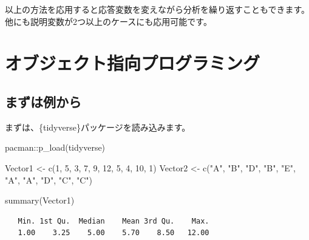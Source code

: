 \documentclass[
  a4paper,
  pandoc,
  ja=standard,
  jafont=haranoaji]{bxjsbook}
\newenvironment{Shaded}{\begin{snugshade}}{\end{snugshade}}
\newcommand{\DecValTok}[1]{\textcolor[rgb]{0.68,0.00,0.00}{#1}}
\newcommand{\FunctionTok}[1]{\textcolor[rgb]{0.28,0.35,0.67}{#1}}
\newcommand{\NormalTok}[1]{\textcolor[rgb]{0.00,0.48,0.65}{#1}}
\newcommand{\OtherTok}[1]{\textcolor[rgb]{0.00,0.48,0.65}{#1}}
\newcommand{\SpecialCharTok}[1]{\textcolor[rgb]{0.37,0.37,0.37}{#1}}
\newcommand{\StringTok}[1]{\textcolor[rgb]{0.13,0.47,0.30}{#1}}
\begin{document}
以上の方法を応用すると応答変数を変えながら分析を繰り返すこともできます。他にも説明変数が2つ以上のケースにも応用可能です。

\hypertarget{sec-oop}{%
\chapter{オブジェクト指向プログラミング}\label{sec-oop}}

\hypertarget{sec-oop_intro}{%
\section{まずは例から}\label{sec-oop_intro}}

まずは、\{tidyverse\}パッケージを読み込みます。

\begin{Shaded}
\begin{Highlighting}[numbers=left,,]
\NormalTok{pacman}\SpecialCharTok{::}\FunctionTok{p\_load}\NormalTok{(tidyverse)}
\end{Highlighting}
\end{Shaded}

\begin{Shaded}
\begin{Highlighting}[numbers=left,,]
\NormalTok{Vector1 }\OtherTok{\textless{}{-}} \FunctionTok{c}\NormalTok{(}\DecValTok{1}\NormalTok{, }\DecValTok{5}\NormalTok{, }\DecValTok{3}\NormalTok{, }\DecValTok{7}\NormalTok{, }\DecValTok{9}\NormalTok{, }\DecValTok{12}\NormalTok{, }\DecValTok{5}\NormalTok{, }\DecValTok{4}\NormalTok{, }\DecValTok{10}\NormalTok{, }\DecValTok{1}\NormalTok{)}
\NormalTok{Vector2 }\OtherTok{\textless{}{-}} \FunctionTok{c}\NormalTok{(}\StringTok{"A"}\NormalTok{, }\StringTok{"B"}\NormalTok{, }\StringTok{"D"}\NormalTok{, }\StringTok{"B"}\NormalTok{, }\StringTok{"E"}\NormalTok{, }\StringTok{"A"}\NormalTok{, }\StringTok{"A"}\NormalTok{, }\StringTok{"D"}\NormalTok{, }\StringTok{"C"}\NormalTok{, }\StringTok{"C"}\NormalTok{)}
\end{Highlighting}
\end{Shaded}

\begin{Shaded}
\begin{Highlighting}[numbers=left,,]
\FunctionTok{summary}\NormalTok{(Vector1)}
\end{Highlighting}
\end{Shaded}

\begin{verbatim}
   Min. 1st Qu.  Median    Mean 3rd Qu.    Max. 
   1.00    3.25    5.00    5.70    8.50   12.00 
\end{verbatim}
\end{document}
